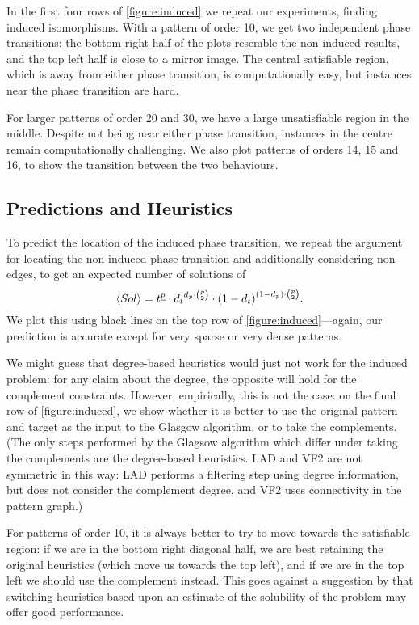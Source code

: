 \documentclass[twoside,11pt]{article}
\newcommand{\citet}[1]{\citeA{#1}}
\begin{document}
In the first four rows of \cref{figure:induced} we repeat our experiments, finding induced
isomorphisms. With a pattern of order 10, we get two independent phase transitions: the bottom right
half of the plots resemble the non-induced results, and the top left half is close to a mirror
image. The central satisfiable region, which is away from either phase transition, is
computationally easy, but instances near the phase transition are hard.

For larger patterns of order 20 and 30, we have a large unsatisfiable region in the middle. Despite
not being near either phase transition, instances in the centre remain computationally challenging.
We also plot patterns of orders 14, 15 and 16, to show the transition between the two behaviours.

\subsection{Predictions and Heuristics}

To predict the location of the induced phase transition, we repeat the argument for locating the
non-induced phase transition and additionally considering non-edges, to get an expected number of
solutions of \begin{equation} \langle Sol \rangle = t^{\underline{p}} \cdot {d_t}^{d_p \cdot \binom{p}{2}} \cdot
{(1 - d_{t})}^{(1 - d_{p}) \cdot \binom{p}{2}} \textnormal{.} \end{equation} We plot this using black lines on
the top row of \cref{figure:induced}---again, our prediction is accurate except for very sparse or
very dense patterns.

We might guess that degree-based heuristics would just not work for the induced problem: for any
claim about the degree, the opposite will hold for the complement constraints. However, empirically,
this is not the case: on the final row of \cref{figure:induced}, we show whether it is better to use
the original pattern and target as the input to the Glasgow algorithm, or to take the complements.
(The only steps performed by the Glagsow algorithm which differ under taking the complements are
the degree-based heuristics.  LAD and VF2 are not symmetric in this way: LAD performs a filtering
step using degree information, but does not consider the complement degree, and VF2 uses
connectivity in the pattern graph.)

For patterns of order 10, it is always better to try to move towards the satisfiable region: if we
are in the bottom right diagonal half, we are best retaining the original heuristics (which move us
towards the top left), and if we are in the top left we should use the complement instead. This
goes against a suggestion by \citet{Walsh:1998} that switching heuristics based upon an estimate of
the solubility of the problem may offer good performance.
\end{document}

